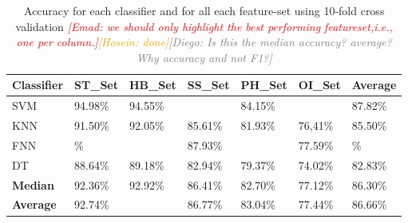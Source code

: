 \documentclass[journal,article,submit,moreauthors,pdftex]{Definitions/mdpi}
\newcommand{\emad}[1]{\textcolor{red}{{\it [Emad: #1]}}}
\newcommand{\hosein}[1]{\textcolor{orange}{{\it [Hosein: #1]}}}
\newcommand{\diego}[1]{\textcolor{gray}{{\it [Diego: #1]}}}
\begin{document}
\begin{table}[H]
	\caption{Accuracy for each classifier and for all each feature-set using 10-fold cross validation \emad{we should only highlight the best performing featureset,i.e., one per column.}\hosein{done}\diego{Is this the median accuracy? average? Why accuracy and not F1?}}
	\centering
	\begin{tabular}{p{2cm}p{1.7cm}p{1.7cm}p{1.7cm}p{1.7cm}p{1.7cm}p{1.7cm}}
		\toprule
		\textbf{Classifier} & \textbf{ST\_Set} & \textbf{HB\_Set} & \textbf{SS\_Set} & \textbf{PH\_Set} & \textbf{OI\_Set} & Average \\
		\midrule
		SVM &  94.98\% & 94.55\% &\cellcolor{gray!35}{89.18\%} &84.15\% & \cellcolor{gray!35}{78.47\%} &87.82\%\\
		KNN & 91.50\% & 92.05\% & 85.61\% &81.93\% & 76,41\%& 85.50\% \\
		FNN & \cellcolor{gray!35}{95.31}\% & \cellcolor{gray!35}{95.89\%} &  87.93\% &\cellcolor{gray!35}{85.34\%} & 77.59\% & \cellcolor{gray!35}{89.04}\%\\
		DT & 88.64\% & 89.18\% &  82.94\% &79.37\% & 74.02\% &82.83\%\\
		\bottomrule
		\textbf{Median} & 92.36\% &  92.92\% &86.41\% & 82.70\% & 77.12\%&86.30\%\\
		\midrule
		\textbf{Average} & 92.74\% &  \cellcolor{gray!35}{93.30\%}  & 86.77\% &83.04\% & 77.44\% &86.66\%\\
		\bottomrule
	\end{tabular}
	\label{accuracy_classifier_featureset}
\end{table}
\end{document}
